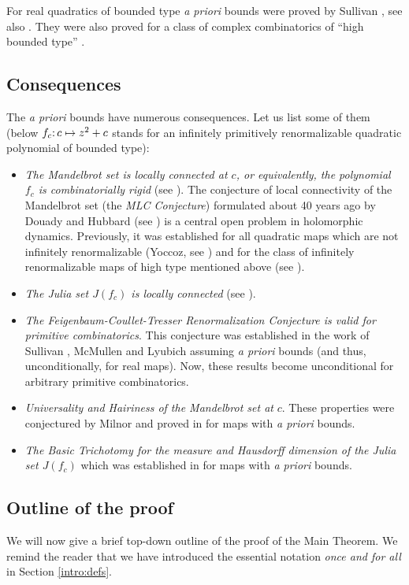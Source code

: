 For real quadratics of bounded type \emph{a priori} bounds were proved by Sullivan \cite{S},
see also \cite{LS,LY,MS}.
They were also proved for a class of complex combinatorics of ``high bounded type'' \cite{puzzle}.



\subsection{Consequences} \label{intro:consequences}

The \emph{a priori} bounds have numerous consequences. Let us list some of them
(below $f_c\mathpunct: c\mapsto z^2+c$ stands for an infinitely primitively renormalizable
quadratic polynomial of bounded type):
\begin{itemize}
\item
{\it The Mandelbrot set is locally connected at $c$, or equivalently,
the polynomial $f_c$ is combinatorially rigid} (see \cite{puzzle}).
The conjecture of local connectivity of the Mandelbrot set (the {\it MLC Conjecture})
formulated  about 40 years ago by Douady and Hubbard  (see \cite{Orsay})
is a central open problem in holomorphic dynamics. Previously, it was established
for all quadratic maps which are not infinitely renormalizable (Yoccoz, see \cite{H}) and
for the class  of infinitely renormalizable maps of high type mentioned above
(see \cite{puzzle}).
\item
   {\it The Julia set $J(f_c)$ is locally connected} (see \cite{HJ,J}).
\item
  {\it  The Feigenbaum-Coullet-Tresser Renormalization Conjecture is valid for primitive combinatorics}.
This conjecture was established in the work of Sullivan \cite{S}, McMullen \cite{towers}
and Lyubich \cite{universe} assuming {\it a priori} bounds (and thus, unconditionally,
for real maps). Now, these results become unconditional for arbitrary primitive combinatorics.
\item
 {\it  Universality and Hairiness of the Mandelbrot set at} $c$.
These properties were conjectured by Milnor \cite{M} and proved in \cite{universe} for maps
with {\it a priori} bounds.
\item
 {\it The Basic Trichotomy for the measure and Hausdorff dimension of the Julia set $J(f_c)$} which was established in \cite{AL}
for maps with {\it a priori} bounds.
\end{itemize}

\subsection{Outline of the proof} \label{intro:outline}
We will now give a brief top-down outline of the proof of the Main Theorem.
We remind the reader that we have introduced the essential notation \emph{once and for all} in Section \ref{intro:defs}.


